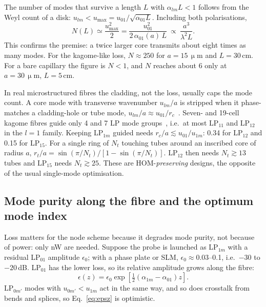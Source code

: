 \documentclass[11pt,a4paper]{article}
\newcommand{\micrometre}{\upmu m}\newcommand{\microkelvin}{\upmu K}
\newcommand{\SI}[2]{\ensuremath{#1\,\mathrm{#2}}}
\begin{document}
The number of modes that survive a length $L$ with $\alpha_{lm}L<1$ follows from the Weyl count of a disk: $u_{lm}<u_{\max}=u_{01}/\sqrt{\alpha_{01}L}$. Including both polarisations,
\begin{equation}
  N(L)\simeq\frac{u_{\max}^2}{2}=\frac{u_{01}^2}{2\,\alpha_{01}(a)\,L}\ \propto\ \frac{a^3}{\lambda^2L}.
  \label{eq:modecount}
\end{equation}
This confirms the premise: a twice larger core transmits about eight times as many modes. For the kagome-like loss, $N\approx250$ for $a=\SI{15}{\micrometre}$ and $L=\SI{30}{cm}$. For a bare capillary the figure is $N<1$, and $N$ reaches about 6 only at $a=\SI{30}{\micrometre}$, $L=\SI{5}{cm}$.

In real microstructured fibres the cladding, not the loss, usually caps the mode count. A core mode with transverse wavenumber $u_{lm}/a$ is stripped when it phase-matches a cladding-hole or tube mode, $u_{lm}/a\approx u_{01}/r_c$~\cite{uebel2016}. Seven- and 19-cell kagome fibres guide only 4 and 7 LP mode groups~\cite{bradley2016}, i.e.\ at most LP$_{11}$ and LP$_{12}$ in the $l=1$ family. Keeping LP$_{1m}$ guided needs $r_c/a\lesssim u_{01}/u_{1m}$: 0.34 for LP$_{12}$ and 0.15 for LP$_{15}$. For a single ring of $N_t$ touching tubes around an inscribed core of radius $a$, $r_t/a=\sin(\pi/N_t)/[1-\sin(\pi/N_t)]$. LP$_{12}$ then needs $N_t\gtrsim13$ tubes and LP$_{15}$ needs $N_t\gtrsim25$. These are HOM-\emph{preserving} designs, the opposite of the usual single-mode optimisation.

\subsection{Mode purity along the fibre and the optimum mode index}
Loss matters for the node scheme because it degrades mode purity, not because of power: only nW are needed. Suppose the probe is launched as LP$_{1m}$ with a residual LP$_{01}$ amplitude $\epsilon_0$; with a phase plate or SLM, $\epsilon_0\approx0.03$--0.1, i.e.\ $-30$ to $-20$\,dB. LP$_{01}$ has the lower loss, so its relative amplitude grows along the fibre:
\begin{equation}
  \epsilon(z)=\epsilon_0\exp\!\left[\tfrac12(\alpha_{1m}-\alpha_{01})z\right].
  \label{eq:epsz}
\end{equation}
LP$_{0m'}$ modes with $u_{0m'}<u_{1m}$ act in the same way, and so does crosstalk from bends and splices, so Eq.~\eqref{eq:epsz} is optimistic.
\end{document}
